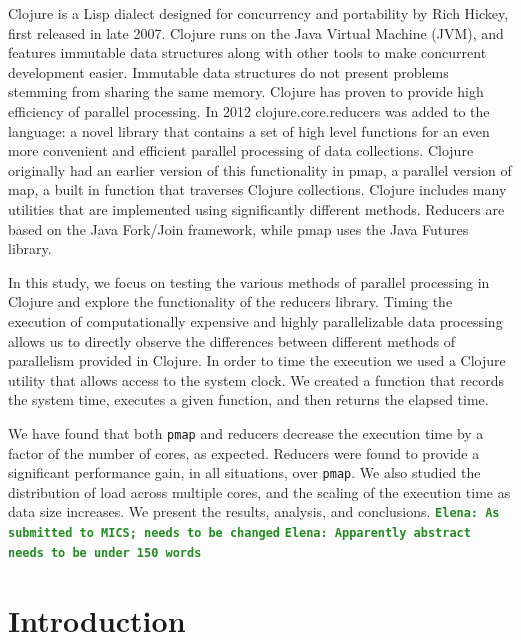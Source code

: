 \documentclass[12pt]{article}
\newcommand{\comment}[1]{{\bf \tt  {#1}}}
\newcommand{\emcomment}[1]{\textcolor{ForestGreen}{\comment{Elena: {#1}}}}
\newcommand{\clocode}[1]{{\texttt {#1}}}
\begin{document}
Clojure is a Lisp dialect designed for concurrency and portability by Rich Hickey, first released in late 2007. Clojure runs on the Java Virtual Machine (JVM), and features immutable data structures along with other tools to make concurrent development easier. Immutable data structures do not present problems stemming from sharing the same memory. Clojure has proven to provide high efficiency of parallel processing. In 2012 clojure.core.reducers was added to the language: a novel library that contains a set of high level functions for an even more convenient and efficient parallel processing of data collections. Clojure originally had an earlier version of this functionality in pmap, a parallel version of map, a built in function that traverses Clojure collections. Clojure includes many utilities that are implemented using significantly different methods. Reducers are based on the Java Fork/Join framework, while pmap uses the Java Futures library.


In this study, we focus on testing the various methods of parallel processing in Clojure and explore the functionality of the reducers library. Timing the execution of computationally expensive and highly parallelizable data processing allows us to directly observe the differences between different methods of parallelism provided in Clojure. In order to time the execution we used a Clojure utility that allows access to the system clock. We created a function that records the system time, executes a given function, and then returns the elapsed time.


We have found that both \clocode{pmap} and reducers decrease the execution time by a factor of the number of cores, as expected. Reducers were found to provide a significant performance gain, in all situations, over \clocode{pmap}. We also studied the distribution of load across multiple cores, and the scaling of the execution time as data size increases. We present the results, analysis, and conclusions.
\emcomment{As submitted to MICS; needs to be changed}
\emcomment{Apparently abstract needs to be under 150 words}


 \newpage

\setcounter{page}{1}


\section{Introduction}\label{sec:intro}
\end{document}
